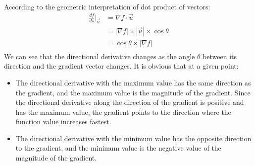 \documentclass{article}
\begin{document}
According to the geometric interpretation of dot product of vectors:
\begin{equation*}
  \begin{split}
    \frac{df}{ds}|_{\vec{u}} &= \nabla f \cdot \vec{u} \\
                             &= |\nabla f| \times |\vec{u}| \times \cos\theta \\
                             &= \cos\theta \times |\nabla f| \\
  \end{split}
\end{equation*}
We can see that the directional derivative changes as the angle $\theta$ between 
its direction and the gradient vector changes. It is obvious that at a given 
point:
\begin{itemize}
  \item The directional derivative with the maximum value has the same direction 
    as the gradient, and the maximum value is the magnitude of the gradient. 
    Since the directional derivative along the direction of the gradient is 
    positive and has the maximum value, the gradient points to the direction 
    where the function value increases fastest.
  \item The directional derivative with the minimum value has the opposite 
    direction to the gradient, and the minimum value is the negative value of 
    the magnitude of the gradient.
\end{itemize}
\end{document}

